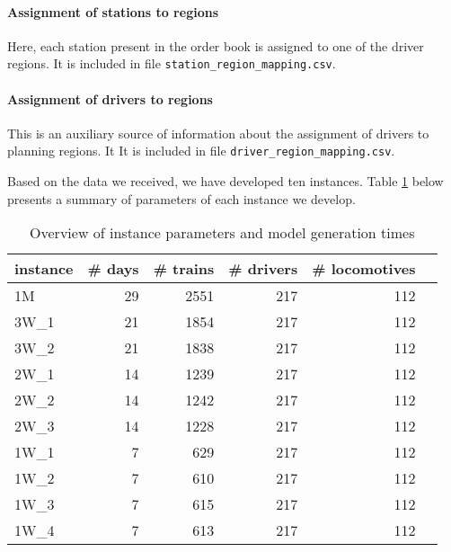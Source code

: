 \paragraph{Assignment of stations to regions} Here, each station present in the order book is assigned to one of the driver regions. It is included in file \texttt{station\_region\_mapping.csv}.

\paragraph{Assignment of drivers to regions} This is an auxiliary source of information about the assignment of drivers to planning regions. It It is included in file \texttt{driver\_region\_mapping.csv}.


Based on the data we received, we have developed ten instances. Table \ref{tab:instance_summary} below presents a summary of parameters of each instance we develop.



\begin{table}[ht]
  \centering
  \caption{Overview of instance parameters and model generation times}
    \begin{tabular}{lrrrrr}
    \toprule
    instance & \multicolumn{1}{l}{\# days} & \multicolumn{1}{l}{\# trains} & \multicolumn{1}{l}{\# drivers} & \multicolumn{1}{l}{\# locomotives} \\
    \midrule
    1M    & 29    & 2551  & 217   & 112 \\
    3W\_1 & 21    & 1854  & 217   & 112  \\
    3W\_2 & 21    & 1838  & 217   & 112 \\
    2W\_1 & 14    & 1239  & 217   & 112  \\
    2W\_2 & 14    & 1242  & 217   & 112  \\
    2W\_3 & 14    & 1228  & 217   & 112  \\
    1W\_1 & 7     & 629   & 217   & 112  \\
    1W\_2 & 7     & 610   & 217   & 112  \\
    1W\_3 & 7     & 615   & 217   & 112 \\
    1W\_4 & 7     & 613   & 217   & 112  \\
    \bottomrule
    \end{tabular}%
  \label{tab:instance_summary}%
\end{table}
